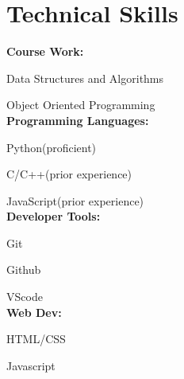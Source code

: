 \documentclass[a4,10.9pt]{article}
\begin{document}
\hfill
\begin{minipage}[t]{0.25\textwidth} 

\section{Technical Skills}
 \begin{itemize}[leftmargin=0.15in, label={}]
    \small{\item{
     \vspace{+3pt}\textbf{Course Work:}
     \vspace{-6pt}\item{Data Structures and Algorithms}
     \vspace{-6pt}\item{Object Oriented Programming} \\
     \vspace{+3pt}\textbf{Programming Languages:}
     \vspace{-6pt}\item{Python(proficient)}
     \vspace{-6pt}\item{C/C++(prior experience)}
     \vspace{-6pt}\item{JavaScript(prior experience)} \\
     \vspace{+3pt}\textbf{Developer Tools:}
     \vspace{-6pt}\item{Git}
     \vspace{-6pt}\item{Github}
     \vspace{-6pt}\item{VScode}\\
     \vspace{+3pt}\textbf{Web Dev:}
     \vspace{-6pt}\item{HTML/CSS}
     \vspace{-6pt}\item{Javascript}
    }}


\end{itemize}
\end{minipage}
\end{document}
